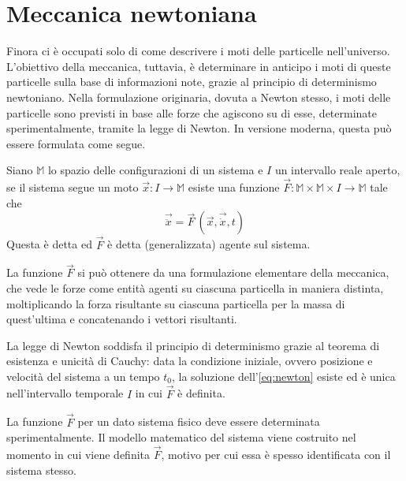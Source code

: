 \section{Meccanica newtoniana}
Finora ci è occupati solo di come descrivere i moti delle particelle nell'universo. L'obiettivo della meccanica, tuttavia, è determinare in anticipo i moti di queste particelle sulla base di informazioni note, grazie al principio di determinismo newtoniano. Nella formulazione originaria, dovuta a Newton stesso, i moti delle particelle sono previsti in base alle forze che agiscono su di esse, determinate sperimentalmente, tramite la legge di Newton. In versione moderna, questa può essere formulata come segue.
\begin{newton}
  Siano $\mathbb{M}$ lo spazio delle configurazioni di un sistema e $I$ un intervallo reale aperto, se il sistema segue un moto $\vec{x}:I \to \mathbb{M}$ esiste una funzione $\vec{F}:\mathbb{M} \times \mathbb{M} \times  I \to \mathbb{M}$ tale che \begin{equation}
  \vec{\ddot{x}} = \vec{F}\,(\vec{x},\vec{\dot{x}}, t) \label{eq:newton}
  \end{equation} 
  Questa è detta  ed $\vec{F}$ è detta  (generalizzata) agente sul sistema.
\end{newton}
\begin{remark}
  La funzione $\vec{F}$ si può ottenere da una formulazione elementare della meccanica, che vede le forze come entità agenti su ciascuna particella in maniera distinta, moltiplicando la forza risultante su ciascuna particella per la massa di quest'ultima e concatenando i vettori risultanti.
\end{remark}
\begin{remark}
  La legge di Newton soddisfa il principio di determinismo grazie al teorema di esistenza e unicità di Cauchy: data la condizione iniziale, ovvero posizione e velocità del sistema a un tempo $t_0$, la soluzione dell'\autoref{eq:newton} esiste ed è unica nell'intervallo temporale $I$ in cui $\vec{F}$ è definita.
\end{remark}
La funzione $\vec{F}$ per un dato sistema fisico deve essere determinata sperimentalmente. Il modello matematico del sistema viene costruito nel momento in cui viene definita $\vec{F}$, motivo per cui essa è spesso identificata con il sistema stesso.

